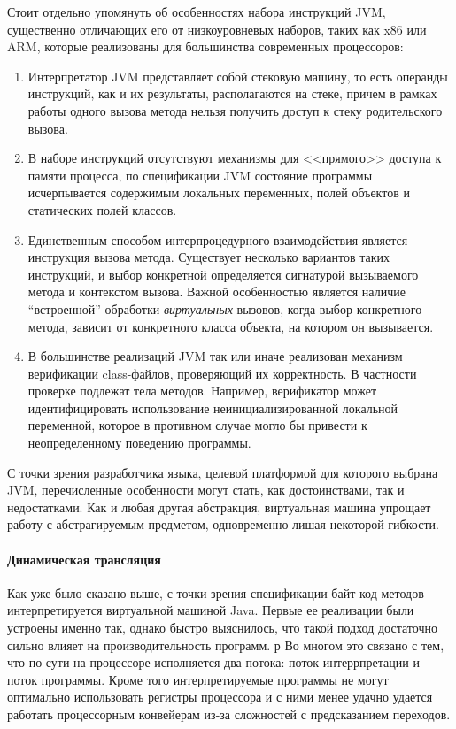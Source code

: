 Стоит отдельно упомянуть об особенностях набора инструкций JVM, существенно отличающих его
от низкоуровневых наборов, таких как x86 или ARM, которые реализованы для большинства современных
процессоров:
\begin{enumerate}
    \item Интерпретатор JVM представляет собой стековую машину, то есть операнды инструкций, как и
    их результаты, располагаются на стеке, причем в рамках работы одного вызова метода
    нельзя получить доступ к стеку родительского вызова.
    \item В наборе инструкций отсутствуют механизмы для <<прямого>> доступа к памяти процесса, по
    спецификации JVM состояние программы исчерпывается содержимым локальных переменных,
    полей объектов и статических полей классов.
    \item Единственным способом интерпроцедурного взаимодействия является инструкция вызова метода.
    Существует несколько вариантов таких инструкций, и выбор конкретной определяется сигнатурой
    вызываемого метода и контекстом вызова. Важной особенностью является наличие ``встроенной''
    обработки \textit{виртуальных} вызовов, когда выбор конкретного метода, зависит от конкретного
    класса объекта, на котором он вызывается.
    \item В большинстве реализаций JVM так или иначе реализован механизм верификации class-файлов,
    проверяющий их корректность. В частности проверке подлежат тела методов. Например, верификатор
    может идентифицировать использование неинициализированной локальной переменной,
    которое в противном случае могло бы привести к неопределенному поведению программы.
\end{enumerate}

С точки зрения разработчика языка, целевой платформой для которого выбрана JVM, перечисленные
особенности могут стать, как достоинствами, так и недостатками. Как и любая другая абстракция,
виртуальная машина упрощает работу с абстрагируемым предметом, одновременно лишая некоторой
гибкости.

\paragraph{Динамическая трансляция}
Как уже было сказано выше, с точки зрения спецификации байт-код методов интерпретируется виртуальной
машиной Java.
Первые ее реализации были устроены именно так, однако быстро выяснилось,
что такой подход достаточно сильно влияет на производительность программ\cite{JavaJIT}.
р
Во многом это связано с тем, что по сути на процессоре исполняется два потока: поток интеррпретации
и поток программы.
Кроме того интерпретируемые программы не могут оптимально использовать регистры процессора и с ними
менее удачно удается работать процессорным конвейерам из-за сложностей с предсказанием
переходов\cite{JVMBranch}.


